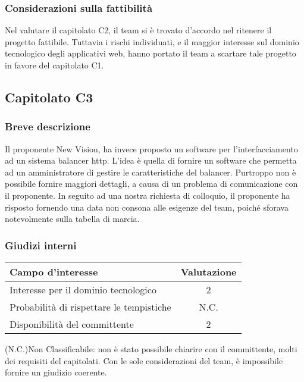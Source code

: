 \subsubsection{Considerazioni sulla fattibilità}
Nel valutare il capitolato C2, il team si è trovato d'accordo nel ritenere il progetto fattibile. Tuttavia i rischi individuati, e il maggior interesse sul dominio tecnologico degli applicativi web, hanno portato il team a scartare tale progetto in favore del capitolato C1.

\subsection{Capitolato C3}
\subsubsection{Breve descrizione}
Il proponente New Vision, ha invece proposto un software per l'interfacciamento ad un sistema balancer http. L'idea è quella di fornire un software che permetta ad un amministratore di gestire le caratteristiche del balancer. Purtroppo non è possibile fornire maggiori dettagli, a causa di un problema di comunicazione con il proponente. In seguito ad una nostra richiesta di colloquio, il proponente ha risposto fornendo una data non consona alle esigenze del team, poiché sforava notevolmente sulla tabella di marcia.
\subsubsection{Giudizi interni}
\begin{center}
\begin{tabular}{lc}
\toprule
Campo d'interesse & Valutazione\\
\midrule %
Interesse per il dominio tecnologico & 2\\
Probabilità di rispettare le tempistiche & N.C.\\
Disponibilità del committente & 2\\
\bottomrule
\end{tabular}
\end{center}
(N.C.)Non Classificabile: non è stato possibile chiarire con il committente, molti dei requisiti del capitolati. Con le sole considerazioni del team, è impossibile fornire un giudizio coerente.

